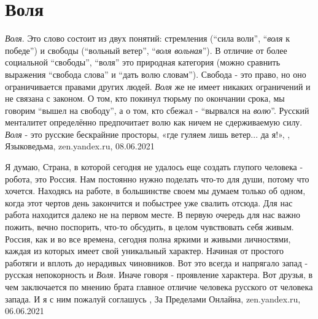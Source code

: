  
 
 
 
 
\chapter{Воля}
\label{sec:slova.volja}

\emph{Воля}. Это слово состоит из двух понятий: стремления (\enquote{сила воли},
\enquote{\emph{воля} к победе}) и свободы (\enquote{вольный ветер}, \enquote{\emph{воля
вольная}}). В отличие от более социальной \enquote{свободы}, \enquote{воля} это
природная категория (можно сравнить выражения \enquote{свобода слова} и
\enquote{дать волю словам}). Свобода - это право, но оно ограничивается правами
других людей. \emph{Воля} же не имеет никаких ограничений и не связана с законом. О
том, кто покинул тюрьму по окончании срока, мы говорим \enquote{вышел на
свободу}, а о том, кто сбежал - \enquote{вырвался на \emph{волю}}. Русский менталитет
определённо предпочитает волю как ничем не сдерживаемую силу. \emph{Воля} - это
русские бескрайние просторы, «где гуляем лишь ветер... да я!»,
, Языковедьма, zen.yandex.ru, 08.06.2021

Я думаю, Страна, в которой сегодня не удалось еще создать глупого
человека - робота, это Россия. Нам постоянно нужно поделать что-то для души,
потому что хочется. Находясь на работе, в большинстве своем мы думаем только об
одном, когда этот чертов день закончится и побыстрее уже свалить отсюда. Для
нас работа находится далеко не на первом месте. В первую очередь для нас важно
пожить, вечно поспорить, что-то обсудить, в целом чувствовать себя живым.
Россия, как и во все времена, сегодня полна яркими и живыми личностями, каждая
из которых имеет свой уникальный характер. Начиная от простого работяги и
вплоть до нерадивых чиновников. Вот это всегда и напрягало запад - русская
непокорность и \emph{Воля}. Иначе говоря - проявление характера.  Вот друзья, в чем
заключается по мнению брата главное отличие человека русского от человека
запада. И я с ним пожалуй соглашусь
, 
За Пределами Онлайна, zen.yandex.ru, 06.06.2021


